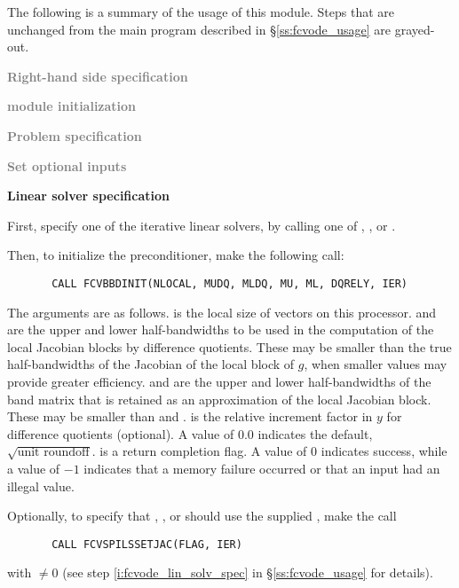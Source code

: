 The following is a summary of the usage of this module. Steps that are unchanged
from the main program described in \S\ref{ss:fcvode_usage} are grayed-out.

\begin{Steps}
  
\item \textcolor{gray}{\bf Right-hand side specification}

\item \textcolor{gray}{\bf {\nvector} module initialization}

\item \textcolor{gray}{\bf Problem specification}

\item \textcolor{gray}{\bf Set optional inputs}

\item {\bf Linear solver specification}

  First, specify one of the {\cvspils} iterative linear solvers, by calling
  one of , , or .

  Then, to initialize the {\cvbbdpre} preconditioner, make the following call:
\begin{verbatim}
       CALL FCVBBDINIT(NLOCAL, MUDQ, MLDQ, MU, ML, DQRELY, IER)
\end{verbatim}
  The arguments are as follows.
   is the local size of vectors on this processor.
   and  are the upper and lower half-bandwidths to be used in 
  the computation of the local Jacobian blocks by difference quotients.
  These may be smaller than the true half-bandwidths of the
  Jacobian of the local block of $g$, when smaller values may
  provide greater efficiency.
   and  are the upper and lower half-bandwidths of the band matrix
  that  is retained as an approximation of the local Jacobian block.
  These may be smaller than  and .
   is the relative increment factor in $y$ for difference quotients
  (optional).  A value of $0.0$ indicates the default, $\sqrt{\text{unit roundoff}}$.
   is a return completion flag.  A value of $0$ indicates success, while
  a value of $-1$ indicates that a memory failure occurred or that an input had
  an illegal value.
    
  Optionally, to specify that {\spgmr}, {\spbcg}, or {\sptfqmr} should use 
  the supplied , make the call
\begin{verbatim}
       CALL FCVSPILSSETJAC(FLAG, IER)
\end{verbatim}
  with  $\neq 0$ 
  (see step \ref{i:fcvode_lin_solv_spec} in \S\ref{ss:fcvode_usage} for details).



\end{Steps}
